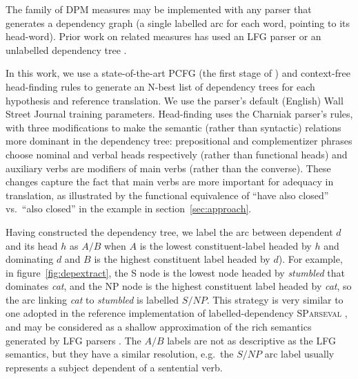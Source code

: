 \documentclass{kluwer}    %
\begin{document}
\begin{article}
The family of DPM measures may be implemented with
any parser that generates a dependency graph (a single labelled arc
for each word, pointing to its head-word). Prior work
\cite{owczarzak07evaluatingmt} on related
measures has used an LFG parser \cite{cahill04lfg} or
an unlabelled dependency tree \cite{liu05syntaxformteval}. 

In this work, we use a state-of-the-art PCFG (the first stage of
) and context-free head-finding
rules \cite{magerman95headfinding} to generate an N-best list of
dependency trees for each hypothesis and reference translation.  We
use the parser's default (English) Wall Street Journal
training parameters.  Head-finding uses the Charniak parser's rules,
with three modifications to make the semantic (rather than syntactic)
relations more dominant in the dependency tree: prepositional and
complementizer phrases choose nominal and verbal heads respectively
(rather than functional heads) and auxiliary verbs are modifiers of
main verbs (rather than the converse). These changes capture the
fact that main verbs are more important for adequacy in translation, as
illustrated by the functional equivalence of ``have also closed'' vs.\ 
``also closed'' in the example in section~\ref{sec:approach}.

Having constructed the dependency tree, we label the arc between dependent
$d$ and its head $h$ as $A/B$ when $A$ is the lowest constituent-label
headed by $h$ and dominating $d$ and $B$ is the highest constituent
label headed by $d$).
%
For example, in figure~\ref{fig:depextract}, the S node is the lowest
node headed by \emph{stumbled} that dominates \emph{cat}, and the NP
node is the highest constituent label headed by \emph{cat}, so the arc
linking \emph{cat} to \emph{stumbled} is labelled $S/NP$.
%
This strategy is very similar to one adopted in the reference
implementation of labelled-dependency \textsc{SParseval} \cite{roark06:sparseval}, and may be
considered as a shallow approximation of the rich semantics generated by LFG
parsers \cite{cahill04lfg}.
%
The $A/B$ labels are not as descriptive as the LFG semantics, but they
have a similar resolution, e.g.\ the $S/NP$ arc label
usually represents a subject dependent of a sentential verb.


\end{article}
\end{document}
